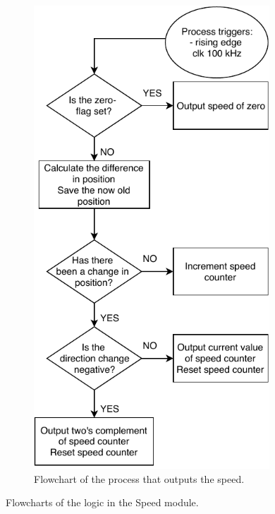 \documentclass[../../main.tex]{subfiles}
\begin{document}
\begin{figure}[h]
\begin{subfigure}{0.48\textwidth}
    \includegraphics[width = 0.97\textwidth]{Sections/System_Implementation/Images/FPGAProcessSpeedOutputFlowchart.pdf}
    \caption{Flowchart of the process that outputs the speed.}
    \label{subfig:FPGAProcessSpeedZeroFlowchart}
\end{subfigure}
\caption{Flowcharts of the logic in the Speed module.}
\label{fig:FPGAProcessSpeedFlowcharts}
\end{figure}
\end{document}

